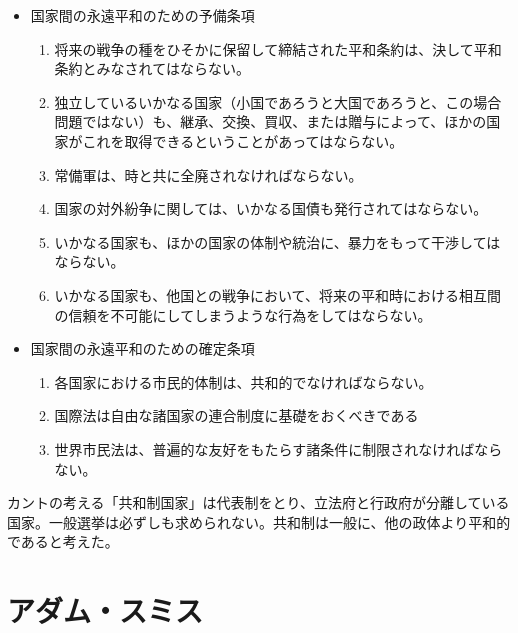 \documentclass[uplatex,dvipdfmx]{jsarticle} \usepackage{mystyle}%
\begin{document}
 \begin{itemize}
\item    国家間の永遠平和のための予備条項
  \begin{enumerate}
  \item 将来の戦争の種をひそかに保留して締結された平和条約は、決して平和条約とみなされてはならない。


  \item 独立しているいかなる国家（小国であろうと大国であろうと、この場合問題ではない）も、継承、交換、買収、または贈与によって、ほかの国家がこれを取得できるということがあってはならない。


  \item 常備軍は、時と共に全廃されなければならない。


  \item 国家の対外紛争に関しては、いかなる国債も発行されてはならない。


  \item いかなる国家も、ほかの国家の体制や統治に、暴力をもって干渉してはならない。


  \item いかなる国家も、他国との戦争において、将来の平和時における相互間の信頼を不可能にしてしまうような行為をしてはならない。

  \end{enumerate}


\item 国家間の永遠平和のための確定条項

  \begin{enumerate}
\item  各国家における市民的体制は、共和的でなければならない。
\item  国際法は自由な諸国家の連合制度に基礎をおくべきである
\item 世界市民法は、普遍的な友好をもたらす諸条件に制限されなければならない。
  \end{enumerate}
 \end{itemize}

 カントの考える「共和制国家」は代表制をとり、立法府と行政府が分離している国家。一般選挙は必ずしも求められない。共和制は一般に、他の政体より平和的であると考えた。



 \section{アダム・スミス}
\end{document}
